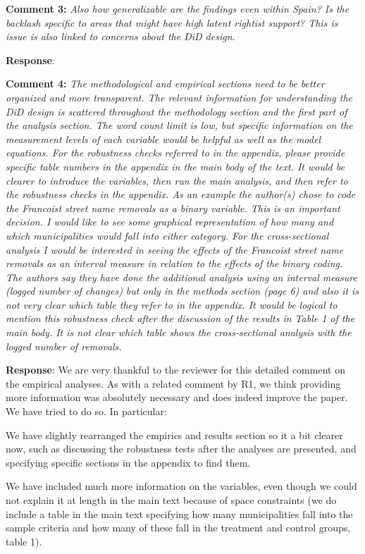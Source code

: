 \documentclass[12pt, a4paper, notitlepage]{article}
\begin{document}
\textbf{Comment 3:} \textit{Also how generalizable are the findings even within Spain? Is the backlash specific to areas that might have high latent rightist support? This is issue is also linked to concerns about the DiD design.}

\textbf{Response}: {\color{red}{pending}}

\textbf{Comment 4:} \textit{The methodological and empirical sections need to be better organized and more transparent. The relevant information for understanding the DiD design is scattered throughout the methodology section and the first part of the analysis section. The word count limit is low, but specific information on the measurement levels of each variable would be helpful as well as the model equations. For the robustness checks referred to in the appendix, please provide specific table numbers in the appendix in the main body of the text. It would be clearer to introduce the variables, then run the main analysis, and then refer to the robustness checks in the appendix. As an example the author(s) chose to code the Francoist street name removals as a binary variable. This is an important decision. I would like to see some graphical representation of how many and which municipalities would fall into either category. For the cross-sectional analysis I would be interested in seeing the effects of the Francoist street name removals as an interval measure in relation to the effects of the binary coding. The authors say they have done the additional analysis using an interval measure (logged number of changes) but only in the methods section (page 6) and also it is not very clear which table they refer to in the appendix. It would be logical to mention this robustness check after the discussion of the results in Table 1 of the main body. It is not clear which table shows the cross-sectional analysis with the logged number of removals.}

\textbf{Response}: We are very thankful to the reviewer for this detailed comment on the empirical analyses.
As with a related comment by R1, we think providing more information was absolutely necessary and does indeed improve the paper. We have tried to do so. In particular:

We have slightly rearranged the empirics and results section so it a bit clearer now, such as discussing the robustness tests after the analyses are presented, and specifying specific sections in the appendix to find them.

We have included much more information on the variables, even though we could not explain it at length in the main text because of space constraints (we do include a table in the main text specifying how many municipalities fall into the sample criteria and how many of these fall in the treatment and control groups, table 1).
\end{document}
